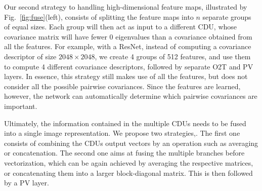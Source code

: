 
Our second strategy to handling high-dimensional feature maps, illustrated by Fig.~\ref{fig:fuse}(left), consists of splitting the feature maps into $n$ separate groups of equal sizes. Each group will then act as input to a different CDU, whose covariance matrix will have fewer 0 eigenvalues than a covariance obtained from all the features. For example, with a ResNet, instead of computing a covariance descriptor of size $2048 \times 2048$, we create 4 groups of 512 features, and use them to compute 4 different covariance descriptors, followed by separate O2T and PV layers. In essence, this strategy still makes use of all the features, but does not consider all the possible pairwise covariances. Since the features are learned, however, the network can automatically determine which pairwise covariances are important.


Ultimately, the information contained in the multiple CDUs needs to be fused into a single image representation. We propose two strategies,. The first one consists of combining the CDUs output vectors by an operation such as averaging or concatenation. The second one aims at fusing the multiple branches before vectorization, which can be again achieved by averaging the respective matrices, or concatenating them into a larger block-diagonal matrix. This is then followed by a PV layer.


